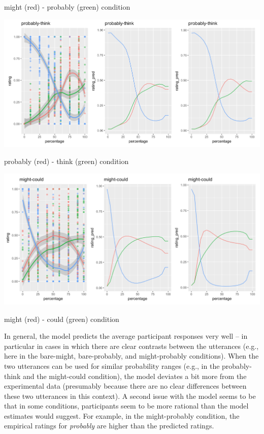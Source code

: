 \documentclass[lucida,biblatex]{sp} %
\begin{document}
\begin{center}
might (red) - probably (green) condition

\vspace{2em}


\includegraphics[width=\textwidth]{figures/probably-think-predictions.png}

probably (red) - think (green) condition

\vspace{2em}


\includegraphics[width=\textwidth]{figures/might-could-predictions.png}

might (red) - could (green) condition

\vspace{2em}


\end{center}

In general, the model predicts the average participant responses very well -- in particular in cases in which there are clear contrasts between the utterances (e.g., here in the bare-might, bare-probably, and might-probably conditions). When the two utterances can be used for similar probability ranges (e.g., in the probably-think and the might-could condition), the model deviates a bit more from the experimental data (presumably because there are no clear differences between these two utterances in this context). A second issue with the model seems to be that in some conditions, participants seem to be more rational than the model estimates would suggest. For example, in the might-probably condition, the empirical ratings for \textit{probably} are higher than the predicted ratings.
\end{document}
